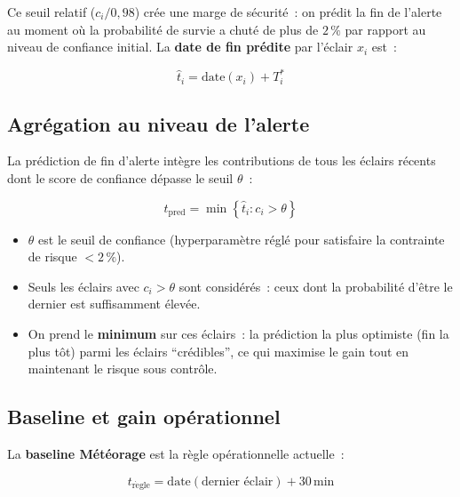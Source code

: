 \documentclass[a4paper,11pt]{article}
\newcommand{\hatt}{\hat{t}}
\newcommand{\tpred}{t_{\mathrm{pred}}}
\newcommand{\trule}{t_{\mathrm{r\grave{e}gle}}}
\begin{document}
Ce seuil relatif ($c_i / 0{,}98$) crée une marge de sécurité~: on prédit la fin de l'alerte au
moment où la probabilité de survie a chuté de plus de $2\,\%$ par rapport au niveau de confiance
initial. La \textbf{date de fin prédite} par l'éclair $x_i$ est~:

\begin{equation}
  \hatt_i = \mathrm{date}(x_i) + T^*_i
  \label{eq:tend_eclair}
\end{equation}

\subsection{Agrégation au niveau de l'alerte}

La prédiction de fin d'alerte intègre les contributions de tous les éclairs récents dont le
score de confiance dépasse le seuil $\theta$~:

\begin{tcolorbox}[defstyle, title={Prédiction de fin d'alerte}]
\begin{equation}
  \tpred = \min\!\left\{ \hatt_i : c_i > \theta \right\}
  \label{eq:tpred}
\end{equation}
\begin{itemize}[leftmargin=1.2em]
  \item $\theta$ est le seuil de confiance (hyperparamètre réglé pour satisfaire la contrainte
    de risque $< 2\,\%$).
  \item Seuls les éclairs avec $c_i > \theta$ sont considérés~: ceux dont la probabilité
    d'être le dernier est suffisamment élevée.
  \item On prend le \textbf{minimum} sur ces éclairs~: la prédiction la plus optimiste (fin
    la plus tôt) parmi les éclairs ``crédibles'', ce qui maximise le gain tout en maintenant
    le risque sous contrôle.
\end{itemize}
\end{tcolorbox}

\subsection{Baseline et gain opérationnel}

La \textbf{baseline Météorage} est la règle opérationnelle actuelle~:

\begin{equation}
  \trule = \mathrm{date}(\text{dernier éclair}) + 30\,\text{min}
  \label{eq:baseline}
\end{equation}
\end{document}
